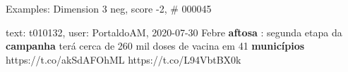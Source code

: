 \begin{frame}{Examples: Dimension 3 neg, score -2, \# 000045}
\footnotesize
\begin{alertblock}{text: t010132, user: PortaldoAM, 2020-07-30}
Febre \textbf{aftosa} : segunda etapa da \textbf{campanha} terá cerca de 260 
mil doses de vacina em 41 \textbf{municípios} https://t.co/akSdAFOhML 
https://t.co/L94VbtBX0k 
\end{alertblock}
\end{frame}
